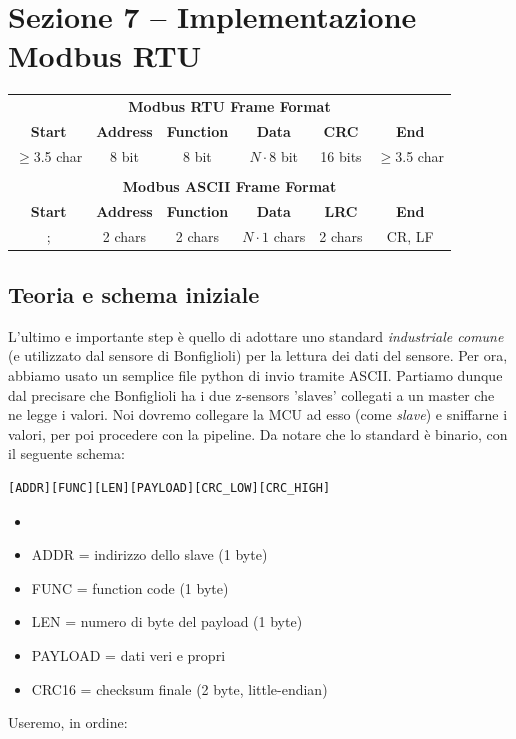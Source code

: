 \section{Sezione 7 -- Implementazione Modbus RTU}

\begin{table}[h]
\centering
\begin{tabular}{c c c c c c}
\multicolumn{6}{c}{\textbf{Modbus RTU Frame Format}}\\[4pt]
\textbf{Start} & \textbf{Address} & \textbf{Function} & \textbf{Data} & \textbf{CRC} & \textbf{End} \\
$\geq$3.5 char & 8 bit & 8 bit & $N \cdot 8$ bit & 16 bits & $\geq$3.5 char \\
\\
\multicolumn{6}{c}{\textbf{Modbus ASCII Frame Format}}\\[4pt]
\textbf{Start} & \textbf{Address} & \textbf{Function} & \textbf{Data} & \textbf{LRC} & \textbf{End} \\
; & 2 chars & 2 chars & $N \cdot 1$ chars & 2 chars & CR, LF \\
\end{tabular}
\end{table}

\subsection{Teoria e schema iniziale}

L'ultimo e importante step è quello di adottare uno standard \textit{industriale comune} (e utilizzato dal sensore di Bonfiglioli) per la lettura dei dati del sensore. Per ora, abbiamo usato un semplice file python di invio tramite ASCII. 
Partiamo dunque dal precisare che Bonfiglioli ha i due z-sensors 'slaves' collegati a un master che ne legge i valori. Noi dovremo collegare la MCU ad esso (come \textit{slave}) e sniffarne i valori, per poi procedere con la pipeline. Da notare che lo standard è binario, con il seguente schema:

\begin{verbatim}
[ADDR][FUNC][LEN][PAYLOAD][CRC_LOW][CRC_HIGH]
\end{verbatim}

\begin{itemize}
    \item 
    \item ADDR = indirizzo dello slave (1 byte)
    \item FUNC = function code (1 byte)
    \item LEN = numero di byte del payload (1 byte)
    \item PAYLOAD = dati veri e propri
    \item CRC16 = checksum finale (2 byte, little-endian)
\end{itemize}
Useremo, in ordine: 

